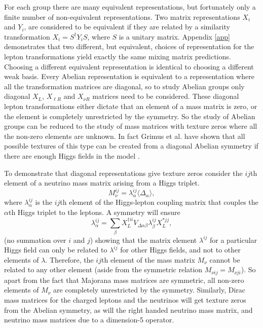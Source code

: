 \documentclass[nofootinbib,showpacs]{revtex4}
\begin{document}
For each group there are many equivalent representations, but fortunately only a finite number of non-equivalent representations. Two matrix representations $X_i$ and $Y_i$, are considered to be equivalent if they are related by a similarity transformation $X_i=S^\dagger Y_i S$, where $S$ is a unitary matrix. Appendix \ref{app} demonstrates that two different, but equivalent, choices of representation for the lepton transformations yield exactly the same mixing matrix predictions. Choosing a different equivalent representation is identical to choosing a different weak basis.
Every Abelian representation is equivalent to a representation where all the transformation matrices are diagonal, so to study Abelian groups only diagonal $X_L$, $X_{\ell R}$ and  $X_{\nu R}$ matrices need to be considered. These diagonal lepton transformations either dictate that an element of a mass matrix is zero, or the element is completely unrestricted by the symmetry. So the study of Abelian groups can be reduced to the study of mass matrices with texture zeros where all the non-zero elements are unknown. In fact Grimus et al. have shown that all possible textures of this type can be created from a diagonal Abelian symmetry if there are enough Higgs fields in the model \cite{grimlavtextures}.

To demonstrate that diagonal representations give texture zeros consider the $ij$th element of a neutrino mass matrix arising from a Higgs triplet. 
\begin{equation}
M^{ij}_{\nu}=\lambda^{ij}_\alpha \langle \Delta_\alpha \rangle,
\end{equation}
 where $\lambda^{ij}_\alpha$ is the $ij$th element of the Higgs-lepton coupling matrix that couples the $\alpha$th Higgs triplet to the leptons. 
A symmetry will ensure 
\begin{equation}
\lambda^{ij}_\alpha=\sum_\beta X_L^{\dagger ii}V_{\Delta \alpha \beta} \lambda^{ij}_\beta X^{* jj}_L, 
\end{equation}
(no summation over $i$ and $j$) showing that the matrix element $\lambda^{ij}$ for a particular Higgs field can only be related to $\lambda^{ij}$ for other Higgs fields, and not to other elements of $\lambda$. Therefore, the $ij$th element of the mass matrix $M_{\nu}$ cannot be related to any other element (aside from the symmetric relation $M_{\nu ij}=M_{\nu ji}$). So apart from the fact that Majorana mass matrices are symmetric, all non-zero elements of $M_{\nu}$ are completely unrestricted by the symmetry.   
Similarly, Dirac mass matrices for the charged leptons and the neutrinos will get texture zeros from the Abelian symmetry, as will the right handed neutrino mass matrix, and neutrino mass matrices due to a dimension-5 operator. 
\end{document}
